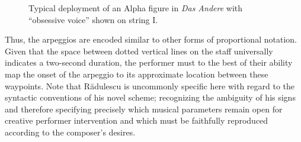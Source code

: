             \begin{figure} 
                \centering
                \captionsetup{width=.5\textwidth}
                \caption[Typical deployment of an Alpha figure in \textit{Das Andere} with ``obsessive voice'' shown on string I.]{Typical deployment of an Alpha figure in \textit{Das Andere} with ``obsessive voice'' shown on string I.\footnotemark}
                \label{fig:alphatypical}
            \end{figure}

        \noindent Thus, the arpeggios are encoded similar to other forms of proportional notation. Given that the space between dotted vertical lines on the staff universally indicates a two-second duration, the performer must to the best of their ability map the onset of the arpeggio to its approximate location between these waypoints. Note that R\u{a}dulescu is uncommonly specific here with regard to the syntactic conventions of his novel scheme; recognizing the ambiguity of his signs and therefore specifying precisely which musical parameters remain open for creative performer intervention and which must be faithfully reproduced according to the composer's desires.


